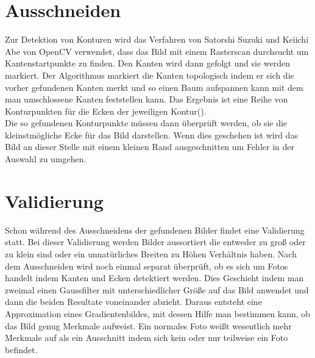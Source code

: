 \section{Ausschneiden}
Zur Detektion von Konturen wird das Verfahren von Satorshi Suzuki und Keiichi Abe von OpenCV verwendet, dass das Bild mit einem Rasterscan durchsucht um Kantenstartpunkte zu finden. Den Kanten wird dann gefolgt und sie werden markiert. Der Algorithmus markiert die Kanten topologisch indem er sich die vorher gefundenen Kanten merkt und so einen Baum aufspannen kann mit dem man umschlossene Kanten feststellen kann. Das Ergebnis ist eine Reihe von Konturpunkten für die Ecken der jeweiligen Kontur(\cite{Suzuki1985}).\\
Die so gefundenen Konturpunkte müssen dann überprüft werden, ob sie die kleinstmögliche Ecke für das Bild darstellen. Wenn dies geschehen ist wird das Bild an dieser Stelle mit einem kleinen Rand ausgeschnitten um Fehler in der Auswahl zu umgehen. 

\section{Validierung}
Schon während des Ausschneidens der gefundenen Bilder findet eine Validierung statt. Bei dieser Validierung werden Bilder aussortiert die entweder zu groß oder zu klein sind oder ein unnatürliches Breiten zu Höhen Verhältnis haben.
Nach dem Ausschneiden wird noch einmal separat überprüft, ob es sich um Fotos handelt indem Kanten und Ecken detektiert werden. Dies Geschieht indem man zweimal einen Gaussfilter mit unterschiedlicher Größe auf das Bild anwendet und dann die beiden Resultate voneinander abzieht. Daraus entsteht eine Approximation eines Gradientenbildes, mit dessen Hilfe man bestimmen kann, ob das Bild genug Merkmale aufweist. Ein normales Foto weißt wesentlich mehr Merkmale auf als ein Ausschnitt indem sich kein oder nur teilweise ein Foto befindet. 